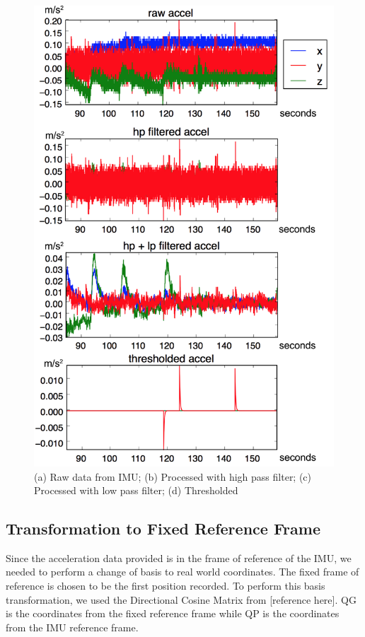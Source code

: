 \documentclass[12pt,journal]{IEEEtran}
\begin{document}
\begin{figure}[h]
  \centering
    \includegraphics[width=\linewidth]{figures/filtering}
  \caption{(a) Raw data from IMU; (b) Processed with high pass filter; (c) Processed with low pass filter; (d) Thresholded}
  \label{fig:filtering}
\end{figure}

\subsection{Transformation to Fixed Reference Frame}
	Since the acceleration data provided is in the frame of reference of the IMU, we needed to perform a change of basis to real world coordinates. The fixed frame of reference is chosen to be the first position recorded. To perform this basis transformation, we used the Directional Cosine Matrix from [reference here]. QG is the coordinates from the fixed reference frame while QP is the coordinates from the IMU reference frame.
\end{document}
